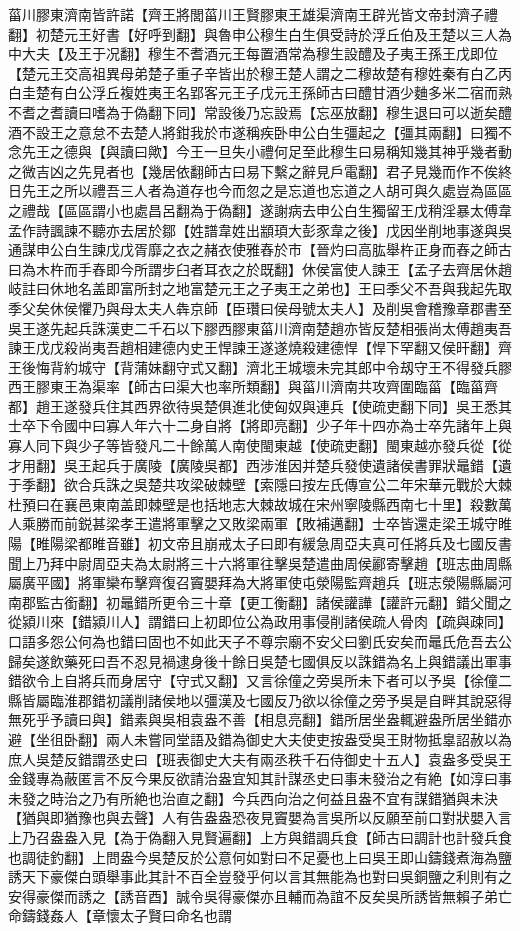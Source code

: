 菑川膠東濟南皆許諾【齊王將閭菑川王賢膠東王雄渠濟南王辟光皆文帝封濟子禮翻】初楚元王好書【好呼到翻】與魯申公穆生白生俱受詩於浮丘伯及王楚以三人為中大夫【及王于况翻】穆生不耆酒元王每置酒常為穆生設醴及子夷王孫王戊即位【楚元王交高祖異母弟楚子重子辛皆出於穆王楚人謂之二穆故楚有穆姓秦有白乙丙白圭楚有白公浮丘複姓夷王名郢客元王子戊元王孫師古曰醴甘酒少麯多米二宿而熟不耆之耆讀曰嗜為于偽翻下同】常設後乃忘設焉【忘巫放翻】穆生退曰可以逝矣醴酒不設王之意怠不去楚人將鉗我於市遂稱疾卧申公白生彊起之【彊其兩翻】曰獨不念先王之德與【與讀曰歟】今王一旦失小禮何足至此穆生曰易稱知幾其神乎幾者動之微吉凶之先見者也【幾居依翻師古曰易下繫之辭見戶電翻】君子見幾而作不俟終日先王之所以禮吾三人者為道存也今而忽之是忘道也忘道之人胡可與久處豈為區區之禮哉【區區謂小也處昌呂翻為于偽翻】遂謝病去申公白生獨留王戊稍淫暴太傅韋孟作詩諷諫不聽亦去居於鄒【姓譜韋姓出顓頊大彭豕韋之後】戊因坐削地事遂與吳通謀申公白生諫戊戊胥靡之衣之赭衣使雅舂於市【晉灼曰高肱舉杵正身而舂之師古曰為木杵而手舂即今所謂步臼者耳衣之於既翻】休侯富使人諫王【孟子去齊居休趙岐註曰休地名盖即富所封之地富楚元王之子夷王之弟也】王曰季父不吾與我起先取季父矣休侯懼乃與母太夫人犇京師【臣瓚曰侯母號太夫人】及削吳會稽豫章郡書至吳王遂先起兵誅漢吏二千石以下膠西膠東菑川濟南楚趙亦皆反楚相張尚太傅趙夷吾諫王戊戊殺尚夷吾趙相建德内史王悍諫王遂遂燒殺建德悍【悍下罕翻又侯旰翻】齊王後悔背約城守【背蒲妹翻守式又翻】濟北王城壞未完其郎中令刼守王不得發兵膠西王膠東王為渠率【師古曰渠大也率所類翻】與菑川濟南共攻齊圍臨菑【臨菑齊都】趙王遂發兵住其西界欲待吳楚俱進北使匈奴與連兵【使疏吏翻下同】吳王悉其士卒下令國中曰寡人年六十二身自將【將即亮翻】少子年十四亦為士卒先諸年上與寡人同下與少子等皆發凡二十餘萬人南使閩東越【使疏吏翻】閩東越亦發兵從【從才用翻】吳王起兵于廣陵【廣陵吳都】西涉淮因并楚兵發使遺諸侯書罪狀鼂錯【遺于季翻】欲合兵誅之吳楚共攻梁破棘壁【索隱曰按左氏傳宣公二年宋華元戰於大棘杜預曰在襄邑東南盖即棘壁是也括地志大棘故城在宋州寧陵縣西南七十里】殺數萬人乘勝而前鋭甚梁孝王遣將軍擊之又敗梁兩軍【敗補邁翻】士卒皆還走梁王城守睢陽【睢陽梁都睢音雖】初文帝且崩戒太子曰即有緩急周亞夫真可任將兵及七國反書聞上乃拜中尉周亞夫為太尉將三十六將軍往擊吳楚遣曲周侯酈寄擊趙【班志曲周縣屬廣平國】將軍欒布擊齊復召竇嬰拜為大將軍使屯滎陽監齊趙兵【班志滎陽縣屬河南郡監古銜翻】初鼂錯所更令三十章【更工衡翻】諸侯讙譁【讙許元翻】錯父聞之從潁川來【錯潁川人】謂錯曰上初即位公為政用事侵削諸侯疏人骨肉【疏與疎同】口語多怨公何為也錯曰固也不如此天子不尊宗廟不安父曰劉氏安矣而鼂氏危吾去公歸矣遂飲藥死曰吾不忍見禍逮身後十餘日吳楚七國俱反以誅錯為名上與錯議出軍事錯欲令上自將兵而身居守【守式又翻】又言徐僮之旁吳所未下者可以予吳【徐僮二縣皆屬臨淮郡錯初議削諸侯地以彊漢及七國反乃欲以徐僮之旁予吳是自畔其說惡得無死乎予讀曰與】錯素與吳相袁盎不善【相息亮翻】錯所居坐盎輒避盎所居坐錯亦避【坐徂卧翻】兩人未嘗同堂語及錯為御史大夫使吏按盎受吳王財物抵辠詔赦以為庶人吳楚反錯謂丞史曰【班表御史大夫有兩丞秩千石侍御史十五人】袁盎多受吳王金錢專為蔽匿言不反今果反欲請治盎宜知其計謀丞史曰事未發治之有絶【如淳曰事未發之時治之乃有所絶也治直之翻】今兵西向治之何益且盎不宜有謀錯猶與未決【猶與即猶豫也與去聲】人有告盎盎恐夜見竇嬰為言吳所以反願至前口對狀嬰入言上乃召盎盎入見【為于偽翻入見賢遍翻】上方與錯調兵食【師古曰調計也計發兵食也調徒釣翻】上問盎今吳楚反於公意何如對曰不足憂也上曰吳王即山鑄錢煮海為鹽誘天下豪傑白頭舉事此其計不百全豈發乎何以言其無能為也對曰吳銅鹽之利則有之安得豪傑而誘之【誘音酉】誠令吳得豪傑亦且輔而為誼不反矣吳所誘皆無賴子弟亡命鑄錢姦人【章懷太子賢曰命名也謂